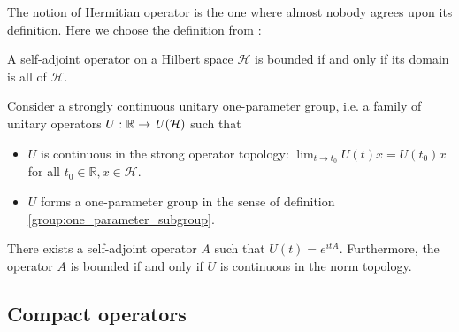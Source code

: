     The notion of Hermitian operator is the one where almost nobody agrees upon its definition. Here we choose the definition from \cite{nlab}:

    \begin{theorem}
        A self-adjoint operator on a Hilbert space $\mathcal{H}$ is bounded if and only if its domain is all of $\mathcal{H}$.
    \end{theorem}

    \begin{theorem}[Stone]\label{operator:stone}
        Consider a strongly continuous unitary one-parameter group, i.e. a family of unitary operators $U:\mathbb{R}\rightarrow\text{\emph{U}}(\mathcal{H})$ such that
        \begin{itemize}
            \item $U$ is continuous in the strong operator topology: $\lim_{t\rightarrow t_0}U(t)x=U(t_0)x$ for all $t_0\in\mathbb{R}, x\in\mathcal{H}$.
            \item $U$ forms a one-parameter group in the sense of definition \ref{group:one_parameter_subgroup}.
        \end{itemize}
            There exists a self-adjoint operator $A$ such that $U(t) = e^{itA}$. Furthermore, the operator $A$ is bounded if and only if $U$ is continuous in the norm topology.
    \end{theorem}

\subsection{Compact operators}



